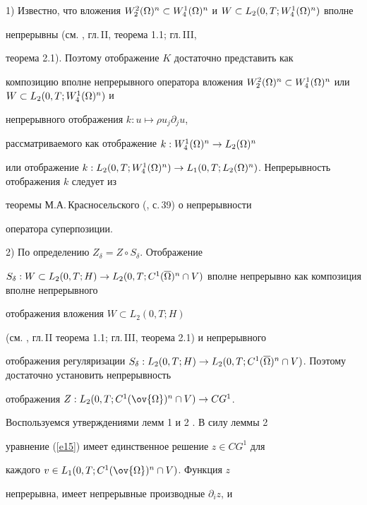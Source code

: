 \begin{pf}


1) Известно, что вложения $W^2_2(\Om)^n


\subset W^1_4(\Om)^n$ и $W \subset L_2(0,T;W^1_4(\Om)^n)$ вполне


непрерывны (см. \cite{Tem}, гл.\,II, теорема 1.1; гл.\,III, 


теорема 2.1). Поэтому отображение $K$ достаточно представить как


композицию вполне непрерывного оператора вложения $W^2_2(\Om)^n


\subset W^1_4(\Om)^n$ или $W \subset L_2(0,T;W^1_4(\Om)^n)$ и


непрерывного отображения $k:u\mapsto\rho u_j\partial_j u$,


рассматриваемого как отображение $k:W^1_4(\Omega)^n \to L_2(\Omega)^n$


или отображение $k:L_2(0,T;W^1_4(\Om)^n)\to


L_1(0,T;L_2(\Om)^n)$. Непрерывность отображения $k$ следует из


теоремы М.А.\,Красносельского (\cite{Kras}, с.\,39) о непрерывности


оператора суперпозиции.





2) По определению $Z_{\delta}=Z\circ S_{\delta}$. Отображение


$S_{\delta}:W\subset L_2(0,T; H)\to L_2(0,T; C^1(\bom)^n\cap


V)$ вполне непрерывно как композиция вполне непрерывного


отображения вложения $W \subset L_2(0,T;H)$


(см. \cite{Tem}, гл.\,II теорема 1.1; гл.\,III, теорема 2.1) и непрерывного


отображения регуляризации $S_{\delta}:L_2(0,T;H)\to L_2(0,T;


C^1(\bom)^n\cap V)$. Поэтому достаточно установить непрерывность


отображения $Z:L_2(0,T;C^1(\ov{\Om})^n\cap V)\to CG^1$.





Воспользуемся утверждениями лемм 1 и 2 \cite{OS}. В силу леммы 2


уравнение (\ref{e15}) имеет единственное решение $z \in CG^1$ для


каждого $v\in L_1(0,T;C^1(\ov{\Om})^n\cap V)$. Функция $z$


непрерывна, имеет непрерывные производные $\partial_i z$, и



\end{pf}
